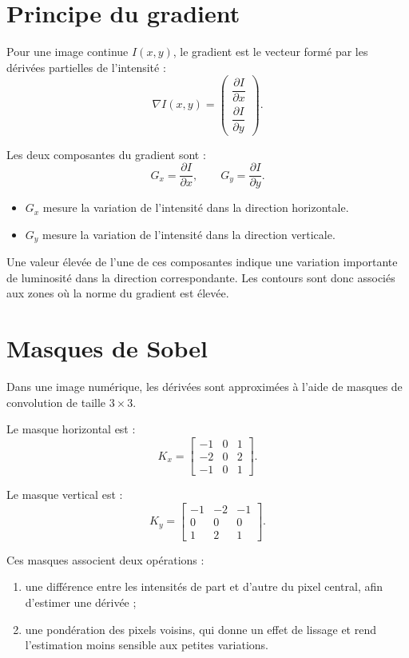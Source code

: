 \documentclass[11pt,a4paper]{article}
\begin{document}
\section{Principe du gradient}

Pour une image continue $I(x,y)$, le gradient est le vecteur formé par les
dérivées partielles de l'intensité :
\[
    \nabla I(x,y)=
    \begin{pmatrix}
        \dfrac{\partial I}{\partial x}\\[4pt]
        \dfrac{\partial I}{\partial y}
    \end{pmatrix}.
\]

Les deux composantes du gradient sont :
\[
    G_x=\frac{\partial I}{\partial x},
    \qquad
    G_y=\frac{\partial I}{\partial y}.
\]

\begin{itemize}[leftmargin=1.2cm]
    \item $G_x$ mesure la variation de l'intensité dans la direction
    horizontale.
    \item $G_y$ mesure la variation de l'intensité dans la direction
    verticale.
\end{itemize}

Une valeur élevée de l'une de ces composantes indique une variation
importante de luminosité dans la direction correspondante. Les contours
sont donc associés aux zones où la norme du gradient est élevée.

\section{Masques de Sobel}

Dans une image numérique, les dérivées sont approximées à l'aide de masques
de convolution de taille $3\times3$.

Le masque horizontal est :
\[
    K_x=
    \begin{bmatrix}
        -1 & 0 & 1\\
        -2 & 0 & 2\\
        -1 & 0 & 1
    \end{bmatrix}.
\]

Le masque vertical est :
\[
    K_y=
    \begin{bmatrix}
        -1 & -2 & -1\\
         0 &  0 &  0\\
         1 &  2 &  1
    \end{bmatrix}.
\]

Ces masques associent deux opérations :
\begin{enumerate}[leftmargin=1.2cm]
    \item une différence entre les intensités de part et d'autre du pixel
    central, afin d'estimer une dérivée ;
    \item une pondération des pixels voisins, qui donne un effet de
    lissage et rend l'estimation moins sensible aux petites variations.
\end{enumerate}
\end{document}
